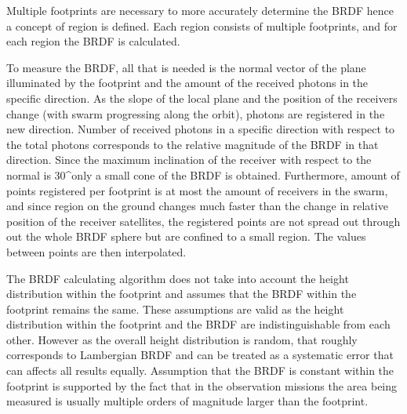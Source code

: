 Multiple footprints are necessary to more accurately determine the BRDF hence a concept of region is defined. Each region consists of multiple footprints, and for each region the BRDF is calculated.

To measure the BRDF, all that is needed is the normal vector of the plane  illuminated by the footprint and the amount of the received photons in the specific direction. As the slope of the local plane and the position of the receivers change (with swarm progressing along the orbit), photons are registered in the new direction. Number of received photons  in a specific direction with respect to the total photons corresponds to the relative magnitude of the BRDF in that direction. Since the maximum inclination of the receiver with respect to the normal is 30^\circ only a small cone of the BRDF is obtained. Furthermore, amount of points registered per footprint is at most the amount of receivers in the swarm, and since region on the ground changes much faster than the change in relative position of the receiver satellites, the registered points are not spread out through out the whole BRDF sphere but are confined to a small region. The values between points are then interpolated. 



The BRDF calculating algorithm does not take into account the height distribution within the footprint and assumes that the BRDF within the footprint remains the same. These assumptions are valid as the height distribution within the footprint and the BRDF are indistinguishable from each other. However as the overall height distribution is random, that roughly corresponds to Lambergian BRDF and can be treated as a systematic error that can affects all results equally. Assumption that the BRDF is constant within the footprint is supported by the fact that in the observation missions the area being measured is usually multiple orders of magnitude larger than the footprint. 





